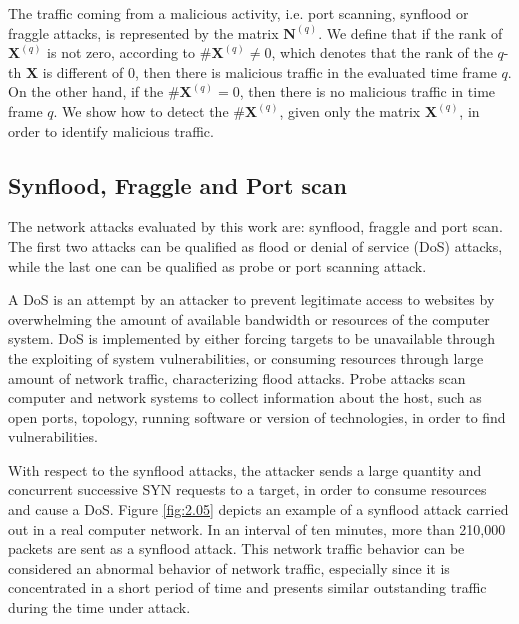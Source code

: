 The traffic coming from a malicious activity, i.e. port scanning, synflood or fraggle attacks, is represented by the matrix $\pmb{N}^{(q)}$. We define that if the rank of $\pmb{X}^{(q)}$ is not zero, according to $\#\pmb{X}^{(q)} \neq 0$, which denotes that the rank of the $q$-th $\pmb{X}$ is different of 0, then there is malicious traffic in the evaluated time frame $q$. On the other hand, if the $\#\pmb{X}^{(q)} = 0$, then there is no malicious traffic in time frame $q$. We show how to detect the $\#\pmb{X}^{(q)}$, given only the matrix $\pmb{X}^{(q)}$, in order to identify malicious traffic.

\subsection{Synflood, Fraggle and Port scan}
\label{sec:2_SynfloodFraggleandPortscan}

The network attacks evaluated by this work are: synflood, fraggle and port scan. The first two attacks can be qualified as flood or denial of service (DoS) attacks, while the last one can be qualified as probe or port scanning attack. 

A DoS is an attempt by an attacker to prevent legitimate access to websites by overwhelming the amount of available bandwidth or resources of the computer system. DoS is implemented by either forcing targets to be unavailable through the exploiting of system vulnerabilities, or consuming resources through large amount of network traffic, characterizing flood attacks. Probe attacks scan computer and network systems to collect information about the host, such as open ports, topology, running software or version of technologies, in order to find vulnerabilities.

With respect to the synflood attacks, the attacker sends a large quantity and concurrent successive SYN requests to a target, in order to consume resources and cause a DoS. Figure \ref{fig:2.05} depicts an example of a synflood attack carried out in a real computer network. In an interval of ten minutes, more than 210,000 packets are sent as a synflood attack. This network traffic behavior can be considered an abnormal behavior of network traffic, especially since it is concentrated in a short period of time and presents similar outstanding traffic during the time under attack.

